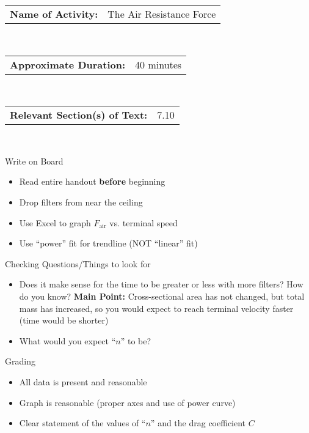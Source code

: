 \documentclass[a4paper]{article}
\begin{document}
\begin{noindent}
\begin{flushleft}

\newcommand{\detail}[2]
{\begin{tabularx}{12 cm}{p{5cm} X}
\textbf{#1:} & #2
\end{tabularx}
\vspace{0.5cm}}

\detail{Name of Activity}{The Air Resistance Force}\\
\detail{Approximate Duration}{40 minutes}\\
\detail{Relevant Section(s) of Text}{7.10}\\

\begin{description}
\item[ Write on Board] 
\end{description}

\begin{itemize}
\item Read entire handout \textbf{before} beginning
\item Drop filters from near the ceiling
\item Use Excel to graph $F_{\text{air}}$ vs. terminal speed
\item Use ``power'' fit for trendline (NOT ``linear'' fit)
\end{itemize}

\begin{description}
\item[Checking Questions/Things to look for] 
\end{description}

\begin{itemize}
\item Does it make sense for the time to be greater or less with more filters? How do you know?
\subitem \textbf{Main Point:} Cross-sectional area has not changed, but total mass has increased, so you would expect to reach terminal velocity faster (time would be shorter)
\item What would you expect ``$n$'' to be?
\end{itemize}

\begin{description}
\item[Grading] 
\end{description}

\begin{itemize}
\item All data is present and reasonable
\item Graph is reasonable (proper axes and use of power curve)
\item Clear statement of the values of ``$n$'' and the drag coefficient $C$
\end{itemize}

\end{flushleft}
\end{noindent}
\end{document}
